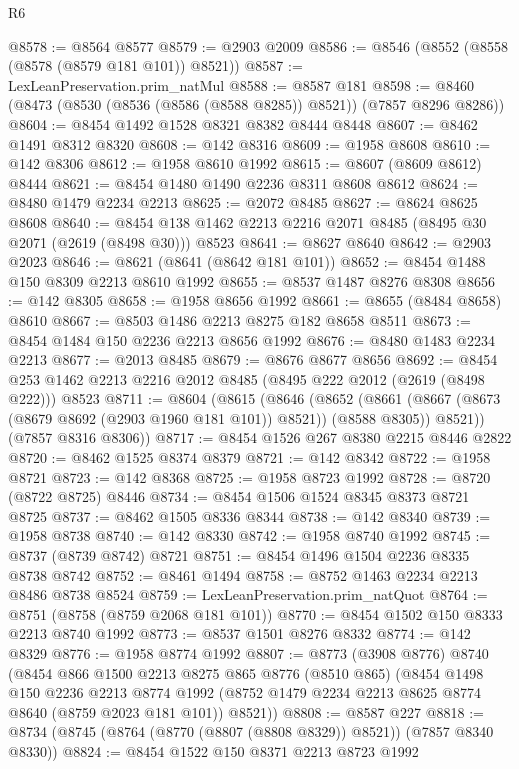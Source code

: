 \begin{lexlean}{R6}
\begin{coremodule}
@8578 := @8564 @8577
@8579 := @2903 @2009
@8586 := @8546 (@8552 (@8558 (@8578 (@8579 @181 @101)) @8521))
@8587 := LexLeanPreservation.prim_natMul
@8588 := @8587 @181
@8598 := @8460 (@8473 (@8530 (@8536 (@8586 (@8588 @8285)) @8521)) (@7857 @8296 @8286))
@8604 := @8454 @1492 @1528 @8321 @8382 @8444 @8448
@8607 := @8462 @1491 @8312 @8320
@8608 := @142 @8316
@8609 := @1958 @8608
@8610 := @142 @8306
@8612 := @1958 @8610 @1992
@8615 := @8607 (@8609 @8612) @8444
@8621 := @8454 @1480 @1490 @2236 @8311 @8608 @8612
@8624 := @8480 @1479 @2234 @2213
@8625 := @2072 @8485
@8627 := @8624 @8625 @8608
@8640 := @8454 @138 @1462 @2213 @2216 @2071 @8485 (@8495 @30 @2071 (@2619 (@8498 @30))) @8523
@8641 := @8627 @8640
@8642 := @2903 @2023
@8646 := @8621 (@8641 (@8642 @181 @101))
@8652 := @8454 @1488 @150 @8309 @2213 @8610 @1992
@8655 := @8537 @1487 @8276 @8308
@8656 := @142 @8305
@8658 := @1958 @8656 @1992
@8661 := @8655 (@8484 @8658) @8610
@8667 := @8503 @1486 @2213 @8275 @182 @8658 @8511
@8673 := @8454 @1484 @150 @2236 @2213 @8656 @1992
@8676 := @8480 @1483 @2234 @2213
@8677 := @2013 @8485
@8679 := @8676 @8677 @8656
@8692 := @8454 @253 @1462 @2213 @2216 @2012 @8485 (@8495 @222 @2012 (@2619 (@8498 @222))) @8523
@8711 := @8604
    (@8615
      (@8646
        (@8652
          (@8661 (@8667 (@8673 (@8679 @8692 (@2903 @1960 @181 @101)) @8521)) (@8588 @8305))
          @8521))
      (@7857 @8316 @8306))
@8717 := @8454 @1526 @267 @8380 @2215 @8446 @2822
@8720 := @8462 @1525 @8374 @8379
@8721 := @142 @8342
@8722 := @1958 @8721
@8723 := @142 @8368
@8725 := @1958 @8723 @1992
@8728 := @8720 (@8722 @8725) @8446
@8734 := @8454 @1506 @1524 @8345 @8373 @8721 @8725
@8737 := @8462 @1505 @8336 @8344
@8738 := @142 @8340
@8739 := @1958 @8738
@8740 := @142 @8330
@8742 := @1958 @8740 @1992
@8745 := @8737 (@8739 @8742) @8721
@8751 := @8454 @1496 @1504 @2236 @8335 @8738 @8742
@8752 := @8461 @1494
@8758 := @8752 @1463 @2234 @2213 @8486 @8738 @8524
@8759 := LexLeanPreservation.prim_natQuot
@8764 := @8751 (@8758 (@8759 @2068 @181 @101))
@8770 := @8454 @1502 @150 @8333 @2213 @8740 @1992
@8773 := @8537 @1501 @8276 @8332
@8774 := @142 @8329
@8776 := @1958 @8774 @1992
@8807 := @8773
    (@3908 @8776)
    @8740
    (@8454
      @866
      @1500
      @2213
      @8275
      @865
      @8776
      (@8510 @865)
      (@8454
        @1498
        @150
        @2236
        @2213
        @8774
        @1992
        (@8752 @1479 @2234 @2213 @8625 @8774 @8640 (@8759 @2023 @181 @101))
        @8521))
@8808 := @8587 @227
@8818 := @8734 (@8745 (@8764 (@8770 (@8807 (@8808 @8329)) @8521)) (@7857 @8340 @8330))
@8824 := @8454 @1522 @150 @8371 @2213 @8723 @1992

\end{coremodule}
\end{lexlean}

